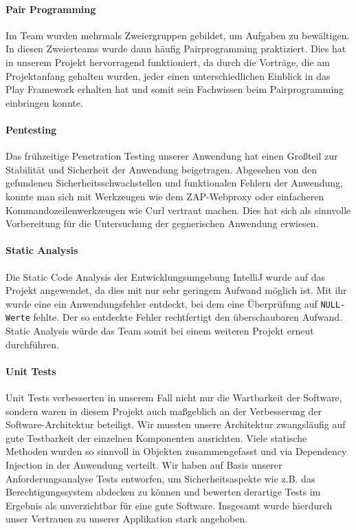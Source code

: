 \documentclass[12pt,DIV14,BCOR10mm,a4paper,parskip=half-,headsepline,headinclude,english,ngerman,bibliography=totocnumbered]{scrreprt}
\begin{document}
\paragraph{Pair Programming} Im Team wurden mehrmals Zweiergruppen gebildet, um Aufgaben zu bewältigen. In diesen Zweierteams wurde dann häufig Pairprogramming praktiziert. Dies hat in unserem Projekt hervorragend funktioniert, da durch die Vorträge, die am Projektanfang gehalten wurden, jeder einen unterschiedlichen Einblick in das Play Framework erhalten hat und somit sein Fachwissen beim Pairprogramming einbringen konnte.


\paragraph{Pentesting} Das frühzeitige Penetration Testing unserer Anwendung hat einen Großteil zur Stabilität und Sicherheit der Anwendung beigetragen. Abgesehen von den gefundenen Sicherheitsschwachstellen und funktionalen Fehlern der Anwendung, konnte man sich mit Werkzeugen wie dem ZAP-Webproxy oder  einfacheren Kommandozeilenwerkzeugen wie Curl vertraut machen. Dies hat sich als sinnvolle Vorbereitung für die Untersuchung der gegnerischen Anwendung erwiesen.

\paragraph{Static Analysis} Die Static Code Analysis der Entwicklungsumgebung IntelliJ wurde auf das Projekt angewendet, da dies mit nur sehr geringem Aufwand möglich ist. Mit ihr wurde eine ein Anwendungsfehler entdeckt, bei dem eine Überprüfung auf \texttt{NULL-Werte} fehlte. Der so entdeckte Fehler rechtfertigt den überschaubaren Aufwand. Static Analysis würde das Team somit bei einem weiteren Projekt erneut durchführen.

\paragraph{Unit Tests} Unit Tests verbesserten in unserem Fall nicht nur die Wartbarkeit der Software, sondern waren in diesem Projekt auch maßgeblich an der Verbesserung der Software-Architektur beteiligt. Wir mussten unsere Architektur zwangsläufig auf gute Testbarkeit der einzelnen Komponenten ausrichten. Viele statische Methoden wurden so sinnvoll in Objekten zusammengefasst und via Dependency Injection in der Anwendung verteilt. Wir haben auf Basis unserer Anforderungsanalyse Tests entworfen, um Sicherheitsaspekte wie z.B. das Berechtigungssystem abdecken zu können und bewerten derartige Tests im Ergebnis als unverzichtbar für eine gute Software. Insgesamt wurde hierdurch unser Vertrauen zu unserer Applikation stark angehoben.
\end{document}
